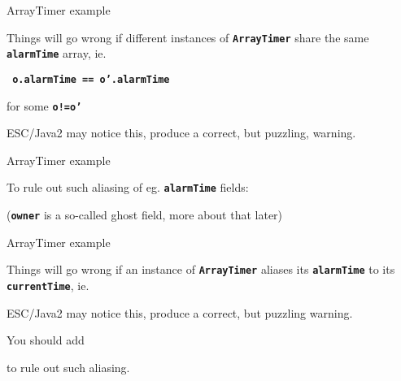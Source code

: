 \documentclass[
pdf,
nocolorBG,
slideColor,
erik,
]{prosper}
\newcommand{\code}[1]{{\rm \texttt{\textbf{\small #1}}}}
\begin{document}
\begin{slide}{ArrayTimer example}
\vspace*{-4ex}


Things will go wrong if different instances of \code{ArrayTimer}
share the same \code{alarmTime} array, ie.
\begin{alltt}\code{\scriptsize
  o.alarmTime == o'.alarmTime}
\end{alltt}
for some \code{o!=o'}

\medskip

ESC/Java2 may notice this, produce a correct, but puzzling, warning.


\end{slide}
\begin{slide}{ArrayTimer example}
\vspace*{-4ex}

To rule out such aliasing of eg. \code{alarmTime} fields:


{\scriptsize\rm (\texttt{\textbf{owner}} is a so-called ghost field, more 
about that later)}

\end{slide}




\begin{slide}{ArrayTimer example}
\vspace*{-4ex}

Things will go wrong if an instance of \code{ArrayTimer}
aliases its \code{alarmTime}  to its \code{currentTime}, ie.

ESC/Java2 may notice this, produce a correct, but puzzling warning.

\medskip

You should add
to rule out such aliasing.

\end{slide}
\end{document}
